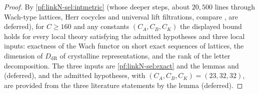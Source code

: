 \begin{proof}
By \cref{pf:linkN-sel:intmetric} (whose deeper steps, about $20{,}500$ lines through Wach-type lattices, Herr cocycles and universal lift
filtrations, compare \cite{Wach1996,Berger2004,Herr1998,FontaineLaffaille1982}, are deferred), for $C\ge160$ and any constants $(C_A,C_B,C_K)$
the displayed bound holds for every local theory satisfying the admitted hypotheses and three local inputs: exactness of the
Wach functor on short exact sequences of lattices, the dimension of $D_{\mathrm{dR}}$ of crystalline representations, and the rank of the
letter decomposition. The three inputs are \cref{pf:linkN-sel:exact} and the lemmas
 and  (deferred), and
the admitted hypotheses, with $(C_A,C_B,C_K)=(23,32,32)$, are provided from the three literature statements by the lemma
 (deferred).
\end{proof}

